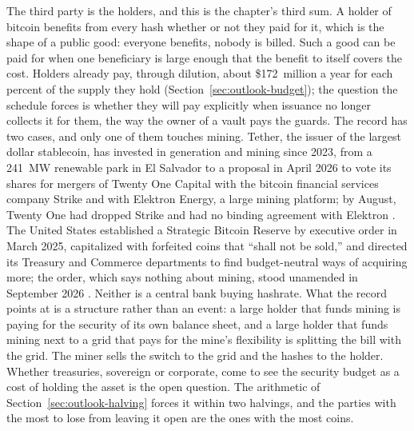 The third party is the holders, and this is the chapter's third sum. A holder of bitcoin benefits from every hash whether or not they paid for it, which is the shape of a public good: everyone benefits, nobody is billed. Such a good can be paid for when one beneficiary is large enough that the benefit to itself covers the cost. Holders already pay, through dilution, about \$172~million a year for each percent of the supply they hold (Section~\ref{sec:outlook-budget}); the question the schedule forces is whether they will pay explicitly when issuance no longer collects it for them, the way the owner of a vault pays the guards. The record has two cases, and only one of them touches mining. Tether, the issuer of the largest dollar stablecoin, has invested in generation and mining since 2023, from a 241~MW renewable park in El Salvador to a proposal in April 2026 to vote its shares for mergers of Twenty One Capital with the bitcoin financial services company Strike and with Elektron Energy, a large mining platform; by August, Twenty One had dropped Strike and had no binding agreement with Elektron \autocite{tether2023volcano,tether2026twentyone,xxi2026q2}. %
The United States established a Strategic Bitcoin Reserve by executive order in March 2025, capitalized with forfeited coins that ``shall not be sold,'' and directed its Treasury and Commerce departments to find budget-neutral ways of acquiring more; the order, which says nothing about mining, stood unamended in September 2026 \autocite{whitehouse2025sbr}. %
Neither is a central bank buying hashrate. What the record points at is a structure rather than an event: a large holder that funds mining is paying for the security of its own balance sheet, and a large holder that funds mining next to a grid that pays for the mine's flexibility is splitting the bill with the grid. The miner sells the switch to the grid and the hashes to the holder. Whether treasuries, sovereign or corporate, come to see the security budget as a cost of holding the asset is the open question. The arithmetic of Section~\ref{sec:outlook-halving} forces it within two halvings, and the parties with the most to lose from leaving it open are the ones with the most coins.

